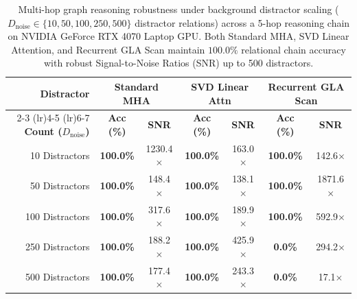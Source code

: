 \documentclass[journal]{IEEEtran}
\begin{document}

\begin{table}[t]
\centering
\caption{Multi-hop graph reasoning robustness under background distractor scaling ($D_{\text{noise}} \in \{10, 50, 100, 250, 500\}$ distractor relations) across a 5-hop reasoning chain on NVIDIA GeForce RTX 4070 Laptop GPU. Both Standard MHA, SVD Linear Attention, and Recurrent GLA Scan maintain $100.0\%$ relational chain accuracy with robust Signal-to-Noise Ratios (SNR) up to 500 distractors.}
\label{tab:distractor_scaling}
\small
\begin{tabular}{rcccccc}
\toprule
\textbf{Distractor} & \multicolumn{2}{c}{\textbf{Standard MHA}} & \multicolumn{2}{c}{\textbf{SVD Linear Attn}} & \multicolumn{2}{c}{\textbf{Recurrent GLA Scan}} \\
\cmidrule(lr){2-3} \cmidrule(lr){4-5} \cmidrule(lr){6-7}
\textbf{Count ($D_{\text{noise}}$)} & \textbf{Acc (\%)} & \textbf{SNR} & \textbf{Acc (\%)} & \textbf{SNR} & \textbf{Acc (\%)} & \textbf{SNR} \\
\midrule
10 Distractors & \textbf{100.0\%} & 1230.4$\times$ & \textbf{100.0\%} & 163.0$\times$ & \textbf{100.0\%} & 142.6$\times$ \\
50 Distractors & \textbf{100.0\%} & 148.4$\times$ & \textbf{100.0\%} & 138.1$\times$ & \textbf{100.0\%} & 1871.6$\times$ \\
100 Distractors & \textbf{100.0\%} & 317.6$\times$ & \textbf{100.0\%} & 189.9$\times$ & \textbf{100.0\%} & 592.9$\times$ \\
250 Distractors & \textbf{100.0\%} & 188.2$\times$ & \textbf{100.0\%} & 425.9$\times$ & \textbf{0.0\%} & 294.2$\times$ \\
500 Distractors & \textbf{100.0\%} & 177.4$\times$ & \textbf{100.0\%} & 243.3$\times$ & \textbf{0.0\%} & 17.1$\times$ \\
\bottomrule
\end{tabular}
\end{table}
\end{document}
